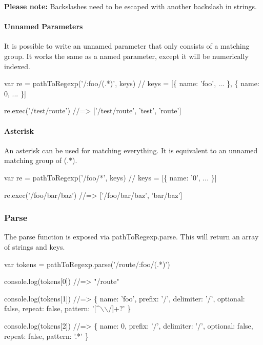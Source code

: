 {\bfseries Please note\+:} Backslashes need to be escaped with another backslash in strings.

\paragraph*{Unnamed Parameters}

It is possible to write an unnamed parameter that only consists of a matching group. It works the same as a named parameter, except it will be numerically indexed.


\begin{DoxyCode}
var re = pathToRegexp('/:foo/(.*)', keys)
// keys = [\{ name: 'foo', ... \}, \{ name: 0, ... \}]

re.exec('/test/route')
//=> ['/test/route', 'test', 'route']
\end{DoxyCode}


\paragraph*{Asterisk}

An asterisk can be used for matching everything. It is equivalent to an unnamed matching group of {\ttfamily (.$\ast$)}.


\begin{DoxyCode}
var re = pathToRegexp('/foo/*', keys)
// keys = [\{ name: '0', ... \}]

re.exec('/foo/bar/baz')
//=> ['/foo/bar/baz', 'bar/baz']
\end{DoxyCode}


\subsubsection*{Parse}

The parse function is exposed via {\ttfamily path\+To\+Regexp.\+parse}. This will return an array of strings and keys.


\begin{DoxyCode}
var tokens = pathToRegexp.parse('/route/:foo/(.*)')

console.log(tokens[0])
//=> "/route"

console.log(tokens[1])
//=> \{ name: 'foo', prefix: '/', delimiter: '/', optional: false, repeat: false, pattern: '[^\(\backslash\)\(\backslash\)/]+?' \}

console.log(tokens[2])
//=> \{ name: 0, prefix: '/', delimiter: '/', optional: false, repeat: false, pattern: '.*' \}
\end{DoxyCode}


